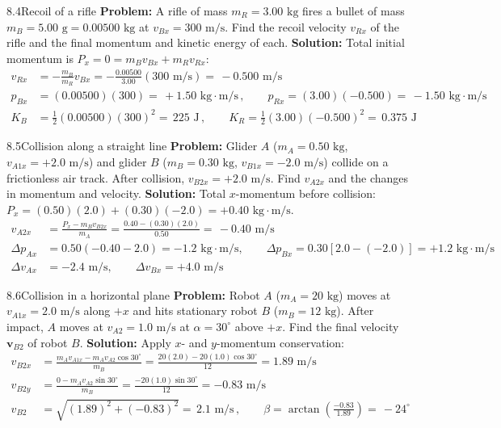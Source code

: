 \documentclass[11pt,a4paper,openany,oneside]{book}
\newcommand{\eqbox}[1]{\boxed{\,#1\,}}
\newcommand{\vect}[1]{\mathbf{#1}}
\numberwithin{equation}{chapter}
\newcommand{\bk}[1]{\texorpdfstring{\enspace{\normalfont\small\color{slate}[Book #1]}}{ [Book #1]}}
\begin{document}
\begin{example}{8.4}{Recoil of a rifle\bk{p.\ 249}}
\textbf{Problem:} A rifle of mass $m_R = 3.00\text{ kg}$ fires a bullet of mass $m_B = 5.00\text{ g} = 0.00500\text{ kg}$ at $v_{Bx} = 300\text{ m/s}$. Find the recoil velocity $v_{Rx}$ of the rifle and the final momentum and kinetic energy of each.
\tcblower
\textbf{Solution:} Total initial momentum is $P_x = 0 = m_B v_{Bx} + m_R v_{Rx}$:
\begin{align*}
  v_{Rx} &= -\frac{m_B}{m_R}v_{Bx} = -\frac{0.00500}{3.00}(300\text{ m/s}) = \eqbox{-0.500\text{ m/s}}\\
  p_{Bx} &= (0.00500)(300) = \eqbox{+1.50\text{ kg}\cdot\text{m/s}}, \qquad p_{Rx} = (3.00)(-0.500) = \eqbox{-1.50\text{ kg}\cdot\text{m/s}}\\
  K_B &= \frac{1}{2}(0.00500)(300)^2 = \eqbox{225\text{ J}}, \qquad K_R = \frac{1}{2}(3.00)(-0.500)^2 = \eqbox{0.375\text{ J}}
\end{align*}
\end{example}

\begin{example}{8.5}{Collision along a straight line\bk{p.\ 249}}
\textbf{Problem:} Glider $A$ ($m_A = 0.50\text{ kg}$, $v_{A1x} = +2.0\text{ m/s}$) and glider $B$ ($m_B = 0.30\text{ kg}$, $v_{B1x} = -2.0\text{ m/s}$) collide on a frictionless air track. After collision, $v_{B2x} = +2.0\text{ m/s}$. Find $v_{A2x}$ and the changes in momentum and velocity.
\tcblower
\textbf{Solution:} Total $x$-momentum before collision: $P_x = (0.50)(2.0) + (0.30)(-2.0) = +0.40\text{ kg}\cdot\text{m/s}$.
\begin{align*}
  v_{A2x} &= \frac{P_x - m_B v_{B2x}}{m_A} = \frac{0.40 - (0.30)(2.0)}{0.50} = \eqbox{-0.40\text{ m/s}}\\
  \Delta p_{Ax} &= 0.50(-0.40 - 2.0) = -1.2\text{ kg}\cdot\text{m/s}, \qquad \Delta p_{Bx} = 0.30[2.0 - (-2.0)] = +1.2\text{ kg}\cdot\text{m/s}\\
  \Delta v_{Ax} &= -2.4\text{ m/s}, \qquad \Delta v_{Bx} = +4.0\text{ m/s}
\end{align*}
\end{example}

\begin{example}{8.6}{Collision in a horizontal plane\bk{p.\ 250}}
\textbf{Problem:} Robot $A$ ($m_A = 20\text{ kg}$) moves at $v_{A1x} = 2.0\text{ m/s}$ along $+x$ and hits stationary robot $B$ ($m_B = 12\text{ kg}$). After impact, $A$ moves at $v_{A2} = 1.0\text{ m/s}$ at $\alpha = 30^\circ$ above $+x$. Find the final velocity $\vect{v}_{B2}$ of robot $B$.
\tcblower
\textbf{Solution:} Apply $x$- and $y$-momentum conservation:
\begin{align*}
  v_{B2x} &= \frac{m_A v_{A1x} - m_A v_{A2}\cos 30^\circ}{m_B} = \frac{20(2.0) - 20(1.0)\cos 30^\circ}{12} = 1.89\text{ m/s}\\
  v_{B2y} &= \frac{0 - m_A v_{A2}\sin 30^\circ}{m_B} = \frac{-20(1.0)\sin 30^\circ}{12} = -0.83\text{ m/s}\\
  v_{B2} &= \sqrt{(1.89)^2 + (-0.83)^2} = \eqbox{2.1\text{ m/s}}, \qquad \beta = \arctan\!\left(\frac{-0.83}{1.89}\right) = \eqbox{-24^\circ}
\end{align*}
\end{example}
\end{document}
